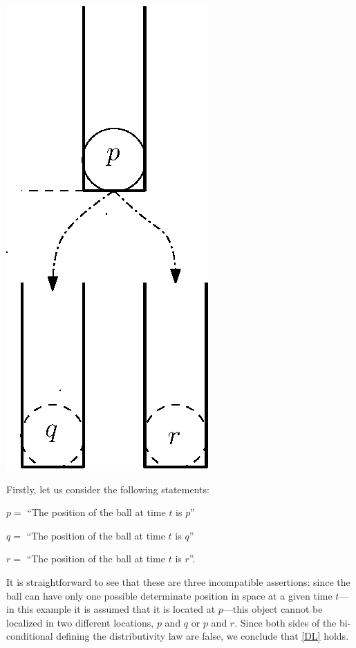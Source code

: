 \documentclass[11pt, executivepaper]{article}
\begin{document}
\begin{center}
\includegraphics[scale=.8]{Ball.eps}
\end{center}

Firstly, let us consider the following statements:

\begin{description}
    \item $p =$ ``The position of the ball at time $t$ is $p$''
    \item $q =$ ``The position of the ball at time $t$ is $q$''
    \item $r =$ ``The position of the ball at time $t$ is $r$''.
\end{description}

\noindent It is straightforward to see that these are three incompatible assertions: since the ball can have only one possible determinate position in space at a given time $t$---in this example it is assumed that it is located at $p$---this object cannot be localized in two different locations, $p$ and $q$ or $p$ and $r$. Since both sides of the bi-conditional defining the distributivity law are false, we conclude that \eqref{DL} holds. 
\end{document}
